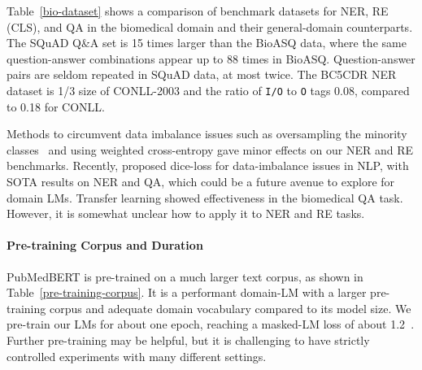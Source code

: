 \documentclass[11pt,a4paper]{article}
\begin{document}
Table~\ref{bio-dataset} shows a comparison of benchmark datasets for NER, RE (CLS), and QA in the biomedical domain and their general-domain counterparts.
The SQuAD Q\&A set is 15 times larger than the BioASQ data, where the same question-answer combinations appear up to 88 times in BioASQ.
Question-answer pairs are seldom repeated in SQuAD data, at most twice.
The BC5CDR NER dataset is 1/3 size of CONLL-2003 and the ratio of \texttt{I/O} to \texttt{O} tags 0.08, compared to 0.18 for CONLL.

Methods to circumvent data imbalance issues such as oversampling the minority classes~\citep{chawla2002smote,chen2010ramoboost} and using weighted cross-entropy gave minor effects on our NER and RE benchmarks.
Recently, \citet{li2019dice} proposed dice-loss for data-imbalance issues in NLP, with SOTA results on NER and QA, which could be a future avenue to explore for domain LMs.
Transfer learning showed effectiveness in the biomedical QA task.
However, it is somewhat unclear how to apply it to NER and RE tasks.


\paragraph{Pre-training Corpus and Duration}

\begin{table}[h]
\centering
{}
\caption{\label{pre-training-corpus}Pre-training text corpus of each biomedical LM. We pre-train on PubMed abstracts and full-text commercial-collection (CC) that are free of copyrights.}
\end{table}

PubMedBERT is pre-trained on a much larger text corpus, as shown in Table~\ref{pre-training-corpus}.
It is a performant domain-LM with a larger pre-training corpus and adequate domain vocabulary compared to its model size.
We pre-train our LMs for about one epoch, reaching a masked-LM loss of about 1.2~\citep{devlin2018bert}.
Further pre-training may be helpful, but it is challenging to have strictly controlled experiments with many different settings.
\end{document}
